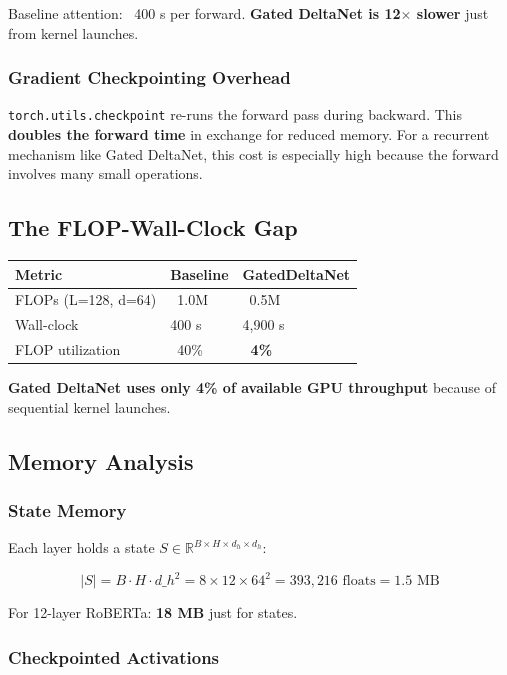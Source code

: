 Baseline attention: ~400  s per forward. \textbf{Gated DeltaNet is 12$\times$ slower} 
just from kernel launches.

\subsubsection{Gradient Checkpointing Overhead}

\texttt{torch.utils.checkpoint} re-runs the forward pass during backward. This 
\textbf{doubles the forward time} in exchange for reduced memory. For a 
recurrent mechanism like Gated DeltaNet, this cost is especially high 
because the forward involves many small operations.

\subsection{The FLOP-Wall-Clock Gap}

\begin{table}[H]
\centering
\small
\begin{tabular}{lll}
\toprule
\textbf{Metric} & \textbf{Baseline} & \textbf{GatedDeltaNet} \\
\midrule
FLOPs (L=128, d=64) & ~1.0M & ~0.5M \\
Wall-clock & 400  s & 4,900  s \\
FLOP utilization & ~40\% & \textbf{~4\%} \\
\bottomrule
\end{tabular}
\end{table}

\textbf{Gated DeltaNet uses only 4\% of available GPU throughput} because of 
sequential kernel launches.

\subsection{Memory Analysis}

\subsubsection{State Memory}

Each layer holds a state $S \in \mathbb{R}^{B \times H \times d_h \times d_h}$:

\[
|S| = B \cdot H \cdot d\_h^2 = 8 \times 12 \times 64^2 = 393,216 \text{ floats} 
= 1.5 \text{ MB}
\]

For 12-layer RoBERTa: \textbf{18 MB} just for states.

\subsubsection{Checkpointed Activations}

